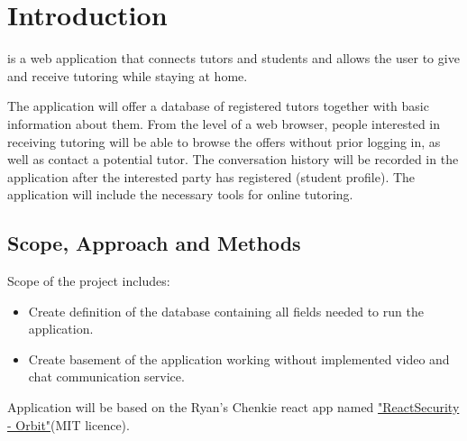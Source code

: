 \section{Introduction}


 is a web application that connects tutors and students and allows the user to give and receive tutoring while staying at home.



The application will offer a database of registered tutors together with basic information about them. From the level of a web browser, people interested in receiving tutoring will be able to browse the offers without prior logging in, as well as contact a potential tutor. The conversation history will be recorded in the application after the interested party has registered (student profile). The application will include the necessary tools for online tutoring. 


\subsection{Scope, Approach and Methods}
Scope of the project includes:
\begin{itemize}
    \item Create definition of the database containing all fields needed to run the application.
    \item Create basement of the application working without implemented video and chat communication service.
\end{itemize}

Application will be based on the Ryan's Chenkie react app named \href{https://github.com/chenkie/orbit}{"ReactSecurity - Orbit"}(MIT licence).

